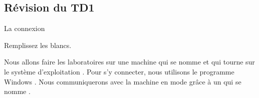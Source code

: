 \documentclass[a4paper,11pt]{article}
\begin{document}
\subsection{Révision du TD1}
\begin{Exercice}{La connexion}


Remplissez les blancs.

Nous allons faire les laboratoires sur une machine
qui se nomme  \textcolor{gray}{\underline{\hspace*{5em}}}  
et qui tourne sur le syst\`eme d'exploitation        
\textcolor{gray}{\underline{\hspace*{3em}}} . 
Pour s'y connecter, nous utilisons le programme Windows        
\textcolor{gray}{\underline{\hspace*{3em}}} . 
Nous communiquerons avec la machine en mode  
\textcolor{gray}{\underline{\hspace*{5em}}}  
gr\^ace \`a un  \textcolor{gray}{\underline{\hspace*{3em}}}  
qui se nomme  \textcolor{gray}{\underline{\hspace*{3em}}} . 
		
\end{Exercice}
\end{document}
